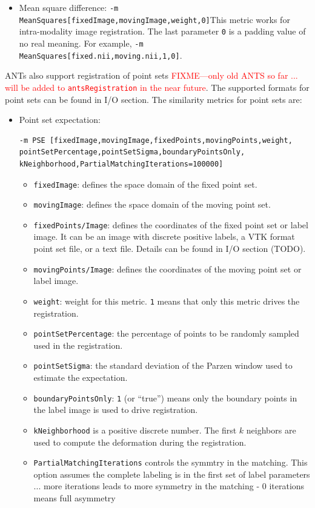 \begin{itemize}
    \item Mean square difference: \newline\texttt{-m
        MeanSquares[fixedImage,movingImage,weight,0]}\newline This metric
      works for intra-modality image registration. The last parameter
      \texttt{0} is a padding value of no real meaning. For example, \texttt{-m MeanSquares[fixed.nii,moving.nii,1,0]}. 

\end{itemize}

ANTs also support registration of point sets
\textcolor{red}{FIXME---only old ANTS so far ... will be added to
  \texttt{antsRegistration} in the near future}. The supported formats for point sets can be found in I/O section. The similarity metrics for point sets are:
\begin{itemize}
    \item Point set expectation: 
     \begin{verbatim}
-m PSE [fixedImage,movingImage,fixedPoints,movingPoints,weight,
pointSetPercentage,pointSetSigma,boundaryPointsOnly,
kNeighborhood,PartialMatchingIterations=100000]
    \end{verbatim}
    \begin{itemize}
        \item \verb"fixedImage": defines the space domain of the fixed point set.
        \item \verb"movingImage": defines the space domain of the moving point set.
        \item \verb"fixedPoints/Image": defines the coordinates of the fixed point set or label image. It can be an image with discrete positive labels, a VTK format point set file, or a text file. Details can be found in I/O section (TODO).
        \item \verb"movingPoints/Image": defines the coordinates of the moving point set or label image. 
        \item \verb"weight": weight for this metric. \verb"1" means that only this metric drives the registration.
        \item \verb"pointSetPercentage": the percentage of points to be randomly sampled used in the registration.
        \item \verb"pointSetSigma": the standard deviation of the Parzen window used to estimate the expectation. 
        \item \verb"boundaryPointsOnly":  \verb"1" (or ``true'') means only the boundary points in the label image is used to drive registration.
        \item \verb"kNeighborhood" is a positive discrete number. The first $k$ neighbors are used to compute the deformation during the registration. 
        \item \verb"PartialMatchingIterations" controls the symmtry in the matching. This option assumes the complete labeling is in the first set of label parameters ... more iterations leads to more symmetry in the matching  - 0 iterations means full asymmetry 
    \end{itemize}


\end{itemize}
